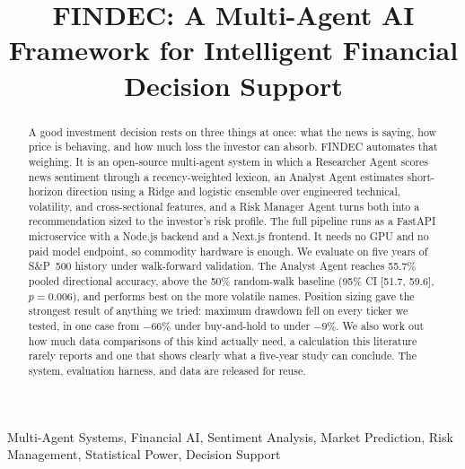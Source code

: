\documentclass[conference]{IEEEtran}
\begin{document}
\title{FINDEC: A Multi-Agent AI Framework for Intelligent Financial Decision Support}

\author{
}

\maketitle

\begin{abstract}
A good investment decision rests on three things at once: what the news is saying, how price is behaving, and how much loss the investor can absorb. FINDEC automates that weighing. It is an open-source multi-agent system in which a Researcher Agent scores news sentiment through a recency-weighted lexicon, an Analyst Agent estimates short-horizon direction using a Ridge and logistic ensemble over engineered technical, volatility, and cross-sectional features, and a Risk Manager Agent turns both into a recommendation sized to the investor's risk profile. The full pipeline runs as a FastAPI microservice with a Node.js backend and a Next.js frontend. It needs no GPU and no paid model endpoint, so commodity hardware is enough. We evaluate on five years of S\&P~500 history under walk-forward validation. The Analyst Agent reaches 55.7\% pooled directional accuracy, above the 50\% random-walk baseline (95\% CI [51.7, 59.6], $p=0.006$), and performs best on the more volatile names. Position sizing gave the strongest result of anything we tried: maximum drawdown fell on every ticker we tested, in one case from $-66\%$ under buy-and-hold to under $-9\%$. We also work out how much data comparisons of this kind actually need, a calculation this literature rarely reports and one that shows clearly what a five-year study can conclude. The system, evaluation harness, and data are released for reuse.
\end{abstract}

\begin{IEEEkeywords}
Multi-Agent Systems, Financial AI, Sentiment Analysis, Market Prediction, Risk Management, Statistical Power, Decision Support
\end{IEEEkeywords}
\end{document}
